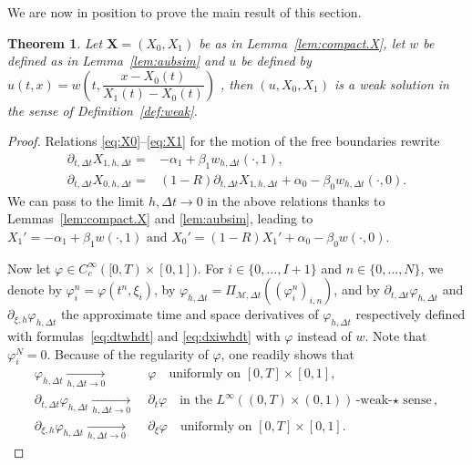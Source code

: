 \documentclass{amsart}
\newcommand\dt{\Delta t}
\newcommand\Mm{{\mathcal M}}
\newcommand\bX{{\boldsymbol X}}
\newcommand\p{\partial}
\newtheorem{theorem}{Theorem}[section]
\begin{document}
We are now in position to prove the main result of this section. 
\begin{theorem}\label{th:conv}
Let $\bX = (X_0,X_1)$ be as in Lemma~\ref{lem:compact.X}, let $w$ be defined as in Lemma~\ref{lem:aubsim} and $u$ be defined by $u(t,x)= w(t,\dfrac{x-X_0(t)}{X_1(t)-X_0(t)})$ , then $(u,X_0,X_1)$ is a weak solution in the sense of Definition~\ref{def:weak}.
\end{theorem}
\begin{proof}
Relations \eqref{eq:X0}--\eqref{eq:X1} for the motion of the free boundaries rewrite 
\begin{align*}
\p_{t,\dt} X_{1,h,\dt} =& -\alpha_1 +\beta_1 w_{h,\dt}(\cdot, 1), \\
\p_{t,\dt} X_{0,h,\dt}  = &(1-R) \p_{t,\dt} X_{1,h,\dt} + \alpha_0 -  \beta_0 w_{h,\dt}(\cdot, 0).
\end{align*}
We can pass to the limit $h,\dt \to 0$ in the above relations thanks to Lemmas~\ref{lem:compact.X} and \ref{lem:aubsim}, leading to 
\(
X_1' = -\alpha_1 +\beta_1 w(\cdot, 1) \mbox{ and } 
X_0'  = (1-R) X_1' + \alpha_0 -  \beta_0 w (\cdot, 0).
\)

Now let $\varphi \in C^\infty_c([0,T)\times[0,1])$. For $i \in \{0,\dots, I+1\}$ and $n \in \{0,\dots, N\}$, we denote by $\varphi_i^n = \varphi(t^n, \xi_i)$,
by $\varphi_{h,\dt} = \Pi_{\Mm,\dt}\left( (\varphi_i^n)_{i,n} \right)$, and by $\partial_{t,\dt} \varphi_{h,\dt}$ and $\partial_{\xi,h} \varphi_{h,\dt}$ the approximate time and space derivatives of 
$\varphi_{h,\dt}$ respectively defined with formulas~\eqref{eq:dtwhdt} and \eqref{eq:dxiwhdt} with $\varphi$ instead of $w$. Note that $\varphi_i^N = 0$. 
Because of the regularity of $\varphi$, one readily shows that %
\begin{align}
\varphi_{h,\dt} \underset{h,\dt \to 0} \longrightarrow & \; \varphi \quad \text{uniformly on }[0,T] \times [0,1], 
\label{eq:conv.phi}\\
\partial_{t,\dt} \varphi_{h,\dt} \underset{h,\dt \to 0} \longrightarrow & \; \partial_t \varphi \quad \text{in the } L^\infty((0,T) \times (0,1))\text{-weak-$\star$ sense}, 
\label{eq:conv.dtphi}\\
\partial_{\xi,h} \varphi_{h,\dt} \underset{h,\dt \to 0} \longrightarrow & \; \partial_\xi \varphi \quad \text{uniformly on }[0,T] \times [0,1].
\label{eq:conv.dxiphi}
\end{align}



\end{proof}
\end{document}
